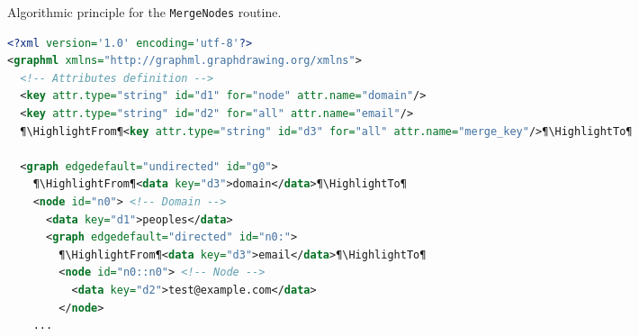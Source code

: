 \begin{algorithm}[p]
\begin{algorithmic}
  \SetAlgoLined
  \SetNlSty{}{}{}
  \DontPrintSemicolon


  \BlankLine

  \CopyNodeAttributes{\g, \gg}\;
  \BlankLine

  \If {\HasSubgraph{\nn}}{
    \eIf{\HasSubgraph{\n}}{
      \MergeGraphs{\GetSubgraph{\n}, \GetSubgraph{\nn}}
    }{
      \AddSubgraph{\n, \GetSubgraph{\nn}}
    }
  }
\end{algorithmic}
\caption[Algorithmic principle for the \texttt{MergeNodes} routine.]{Algorithmic principle for the \texttt{MergeNodes} routine.}
\label{alg:mergenode}
\end{algorithm}

\begin{lstlisting}[caption={Multi-domain graphs in GraphML format augmented with the necessary key information for document merging.},label=lst:multi-graph-merge,language=xml]
<?xml version='1.0' encoding='utf-8'?>
<graphml xmlns="http://graphml.graphdrawing.org/xmlns">
  <!-- Attributes definition -->
  <key attr.type="string" id="d1" for="node" attr.name="domain"/>
  <key attr.type="string" id="d2" for="all" attr.name="email"/>
  ¶\HighlightFrom¶<key attr.type="string" id="d3" for="all" attr.name="merge_key"/>¶\HighlightTo¶

  <graph edgedefault="undirected" id="g0">
    ¶\HighlightFrom¶<data key="d3">domain</data>¶\HighlightTo¶
    <node id="n0"> <!-- Domain -->
      <data key="d1">peoples</data>
      <graph edgedefault="directed" id="n0:">
        ¶\HighlightFrom¶<data key="d3">email</data>¶\HighlightTo¶
        <node id="n0::n0"> <!-- Node -->
          <data key="d2">test@example.com</data>
        </node>
    ...
\end{lstlisting}


